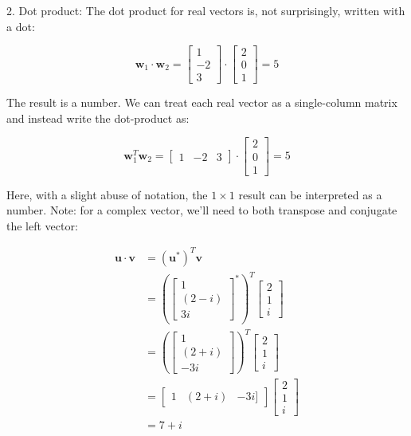 \documentclass[main.tex]{subfiles}
\begin{document}
    2. Dot product: The dot product for real vectors is, not surprisingly, written with a dot:
    
    $$
    \mathbf{w}_{1} \cdot \mathbf{w}_{2}=\left[\begin{array}{r}
    1 \\
    -2 \\
    3
    \end{array}\right] \cdot\left[\begin{array}{l}
    2 \\
    0 \\
    1
    \end{array}\right]=5
    $$
    
    The result is a number. We can treat each real vector as a single-column matrix and instead write the dot-product as:
    
    $$
    \mathbf{w}_{1}^{T} \mathbf{w}_{2}=\left[\begin{array}{lll}
    1 & -2 & 3
    \end{array}\right] \cdot\left[\begin{array}{l}
    2 \\
    0 \\
    1
    \end{array}\right]=5
    $$
    
    Here, with a slight abuse of notation, the $1 \times 1$ result can be interpreted as a number. Note: for a complex vector, we'll need to both transpose and conjugate the left vector:
    
    $$
    \begin{aligned}
    \mathbf{u} \cdot \mathbf{v} &=\left(\mathbf{u}^{*}\right)^{T} \mathbf{v} \\
    &=\left(\left[\begin{array}{c}
    1 \\
    (2-i) \\
    3 i
    \end{array}\right]^{*}\right)^{T}\left[\begin{array}{l}
    2 \\
    1 \\
    i
    \end{array}\right] \\
    &=\left(\left[\begin{array}{c}
    1 \\
    (2+i) \\
    -3 i
    \end{array}\right]\right)^{T}\left[\begin{array}{l}
    2 \\
    1 \\
    i
    \end{array}\right] \\
    &=\left[\begin{array}{lll}
    1 & (2+i) & -3 i]
    \end{array}\right]\left[\begin{array}{l}
    2 \\
    1 \\
    i
    \end{array}\right] \\
    &=7+i
    \end{aligned}
    $$
    
\end{document}
